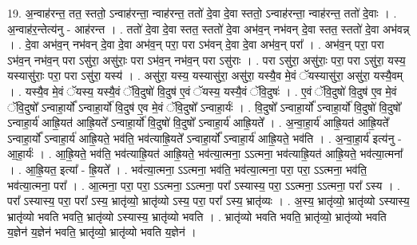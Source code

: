 \documentclass[17pt]{extarticle}
\begin{document}
19. अ॒न्वाह॑रन्त॒ तत॒ स्ततो॒ ऽन्वाह॑रन्ता॒ न्वाह॑रन्त॒ ततो॑ दे॒वा दे॒वा स्ततो॒ ऽन्वाह॑रन्ता॒ न्वाह॑रन्त॒ ततो॑ दे॒वाः । . अ॒न्वाह॑र॒न्तेत्य॑नु - आह॑रन्त । . ततो॑ दे॒वा दे॒वा स्तत॒ स्ततो॑ दे॒वा अभ॑व॒न् नभ॑वन् दे॒वा स्तत॒ स्ततो॑ दे॒वा अभ॑वन्न् । . दे॒वा अभ॑व॒न् नभ॑वन् दे॒वा दे॒वा अभ॑व॒न् परा॒ परा ऽभ॑वन् दे॒वा दे॒वा अभ॑व॒न् परा᳚ । . अभ॑व॒न् परा॒ परा ऽभ॑व॒न् नभ॑व॒न् परा ऽसु॑रा॒ असु॑राः॒ परा ऽभ॑व॒न् नभ॑व॒न् परा ऽसु॑राः । . परा ऽसु॑रा॒ असु॑राः॒ परा॒ परा ऽसु॑रा॒ यस्य॒ यस्यासु॑राः॒ परा॒ परा ऽसु॑रा॒ यस्य॑ । . असु॑रा॒ यस्य॒ यस्यासु॑रा॒ असु॑रा॒ यस्यै॒व मे॒वं ॅयस्यासु॑रा॒ असु॑रा॒ यस्यै॒वम् । . यस्यै॒व मे॒वं ॅयस्य॒ यस्यै॒वं ॅवि॒दुषो॑ वि॒दुष॑ ए॒वं ॅयस्य॒ यस्यै॒वं ॅवि॒दुषः॑ । . ए॒वं ॅवि॒दुषो॑ वि॒दुष॑ ए॒व मे॒वं ॅवि॒दुषो᳚ ऽन्वाहा॒र्यो᳚ ऽन्वाहा॒र्यो॑ वि॒दुष॑ ए॒व मे॒वं ॅवि॒दुषो᳚ ऽन्वाहा॒र्यः॑ । . वि॒दुषो᳚ ऽन्वाहा॒र्यो᳚ ऽन्वाहा॒र्यो॑ वि॒दुषो॑ वि॒दुषो᳚ ऽन्वाहा॒र्य॑ आह्रि॒यत॑ आह्रि॒यते᳚ ऽन्वाहा॒र्यो॑ वि॒दुषो॑ वि॒दुषो᳚ ऽन्वाहा॒र्य॑ आह्रि॒यते᳚ । . अ॒न्वा॒हा॒र्य॑ आह्रि॒यत॑ आह्रि॒यते᳚ ऽन्वाहा॒र्यो᳚ ऽन्वाहा॒र्य॑ आह्रि॒यते॒ भव॑ति॒ भव॑त्याह्रि॒यते᳚ ऽन्वाहा॒र्यो᳚ ऽन्वाहा॒र्य॑ आह्रि॒यते॒ भव॑ति । . अ॒न्वा॒हा॒र्य॑ इत्य॑नु - आ॒हा॒र्यः॑ । . आ॒ह्रि॒यते॒ भव॑ति॒ भव॑त्याह्रि॒यत॑ आह्रि॒यते॒ भव॑त्या॒त्मना॒ ऽऽत्मना॒ भव॑त्याह्रि॒यत॑ आह्रि॒यते॒ भव॑त्या॒त्मना᳚ । . आ॒ह्रि॒यत॒ इत्या᳚ - ह्रि॒यते᳚ । . भव॑त्या॒त्मना॒ ऽऽत्मना॒ भव॑ति॒ भव॑त्या॒त्मना॒ परा॒ परा॒ ऽऽत्मना॒ भव॑ति॒ भव॑त्या॒त्मना॒ परा᳚ । . आ॒त्मना॒ परा॒ परा॒ ऽऽत्मना॒ ऽऽत्मना॒ परा᳚ ऽस्यास्य॒ परा॒ ऽऽत्मना॒ ऽऽत्मना॒ परा᳚ ऽस्य । . परा᳚ ऽस्यास्य॒ परा॒ परा᳚ ऽस्य॒ भ्रातृ॑व्यो॒ भ्रातृ॑व्यो ऽस्य॒ परा॒ परा᳚ ऽस्य॒ भ्रातृ॑व्यः । . अ॒स्य॒ भ्रातृ॑व्यो॒ भ्रातृ॑व्यो ऽस्यास्य॒ भ्रातृ॑व्यो भवति भवति॒ भ्रातृ॑व्यो ऽस्यास्य॒ भ्रातृ॑व्यो भवति । . भ्रातृ॑व्यो भवति भवति॒ भ्रातृ॑व्यो॒ भ्रातृ॑व्यो भवति य॒ज्ञेन॑ य॒ज्ञेन॑ भवति॒ भ्रातृ॑व्यो॒ भ्रातृ॑व्यो भवति य॒ज्ञेन॑ । \newline
\end{document}
